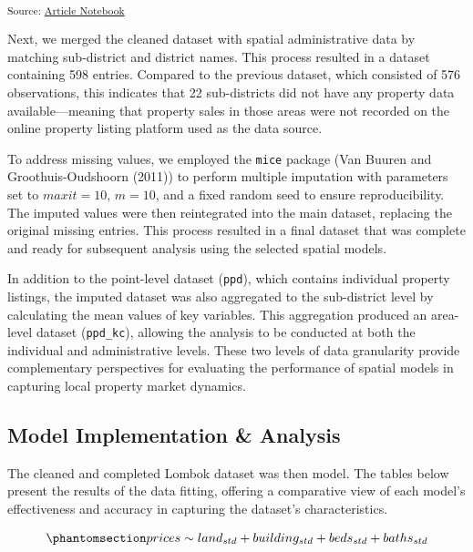\documentclass[
  default,
]{sn-jnl}
\begin{document}
\endgroup{}

\textsubscript{Source:
\href{https://indiraputeri-phd.github.io/CAR_simcomp/manuscript.qmd.html}{Article
Notebook}}

Next, we merged the cleaned dataset with spatial administrative data by
matching sub-district and district names. This process resulted in a
dataset containing 598 entries. Compared to the previous dataset, which
consisted of 576 observations, this indicates that 22 sub-districts did
not have any property data available---meaning that property sales in
those areas were not recorded on the online property listing platform
used as the data source.

To address missing values, we employed the \texttt{mice} package (Van
Buuren and Groothuis-Oudshoorn (2011)) to perform multiple imputation
with parameters set to \(maxit = 10\), \(m = 10\), and a fixed random
seed to ensure reproducibility. The imputed values were then
reintegrated into the main dataset, replacing the original missing
entries. This process resulted in a final dataset that was complete and
ready for subsequent analysis using the selected spatial models.

In addition to the point-level dataset (\texttt{ppd}), which contains
individual property listings, the imputed dataset was also aggregated to
the sub-district level by calculating the mean values of key variables.
This aggregation produced an area-level dataset (\texttt{ppd\_kc}),
allowing the analysis to be conducted at both the individual and
administrative levels. These two levels of data granularity provide
complementary perspectives for evaluating the performance of spatial
models in capturing local property market dynamics.

\subsection{Model Implementation \&
Analysis}\label{model-implementation-analysis}

The cleaned and completed Lombok dataset was then model. The tables
below present the results of the data fitting, offering a comparative
view of each model's effectiveness and accuracy in capturing the
dataset's characteristics.

\begin{equation}\phantomsection\label{eq-lopreg}{
prices \sim land_{std} + building_{std} + beds_{std} + baths_{std}
}\end{equation}
\end{document}
